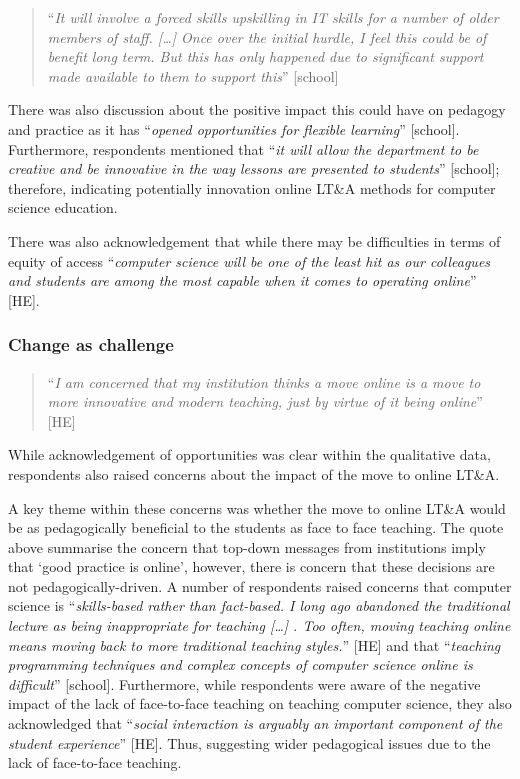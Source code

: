 \documentclass[sigconf]{acmart}
\begin{document}
\begin{quotation}
``{\emph{It will involve a forced skills upskilling in IT skills for a
number of older members of staff. […] Once over the initial hurdle, I
feel this could be of benefit long term. But this has only happened
due to significant support made available to them to support this}}''
[school]
\end{quotation}

There was also discussion about the positive impact this could have on
pedagogy and practice as it has ``{\emph{opened opportunities for
    flexible learning}}” [school]. Furthermore, respondents mentioned that
``{\emph{it will allow the department to be creative and be innovative
in the way lessons are presented to students}}'' [school]; therefore,
indicating potentially innovation online LT\&A methods for computer
science education.

There was also acknowledgement that while there may be difficulties in
terms of equity of access ``{\emph{computer science will be one of the
least hit as our colleagues and students are among the most capable
when it comes to operating online}}'' [HE].

\subsubsection{Change as challenge}

\begin{quotation}
``{\emph{I am concerned that my institution thinks a move online is a
move to more innovative and modern teaching, just by virtue of it
being online}}'' [HE]
\end{quotation}

While acknowledgement of opportunities was clear within the
qualitative data, respondents also raised concerns about the impact of
the move to online LT\&A.

A key theme within these concerns was whether the move to online LT\&A
would be as pedagogically beneficial to the students as face to face
teaching. The quote above summarise the concern that top-down messages
from institutions imply that `good practice is online', however, there
is concern that these decisions are not pedagogically-driven. A number
of respondents raised concerns that computer science is
``{\emph{skills-based rather than fact-based.  I long ago abandoned
the traditional lecture as being inappropriate for teaching […] .  Too
often, moving teaching online means moving back to more traditional
teaching styles.}}” [HE] and that ``{\emph{teaching programming
techniques and complex concepts of computer science online is
difficult}}'' [school]. Furthermore, while respondents were aware of
the negative impact of the lack of face-to-face teaching on teaching
computer science, they also acknowledged that ``{\emph{social
interaction is arguably an important component of the student
experience}}'' [HE]. Thus, suggesting wider pedagogical issues due to
the lack of face-to-face teaching.
\end{document}
